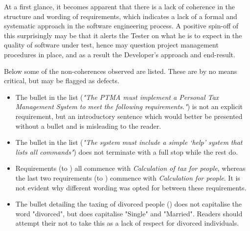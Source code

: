 At a first glance, it becomes apparent that there is a lack of coherence in the structure and wording of requirements, which indicates a lack of a formal and systematic approach in the software engineering process.  A positive spin-off of this surprisingly may be that it alerts the Tester on what he is to expect in the quality of software under test, hence may question project management procedures in place, and as a result the Developer’s approach and end-result.
\par
Below some of the non-coherences observed are listed. These are by no means critical, but may be flagged as defects.
\begin{itemize}
    \item The  bullet in the list (\textit{"The PTMA must implement a Personal Tax Management System to meet the following requirements."}) is not an explicit requirement, but an introductory sentence which would better be presented without a bullet and is misleading to the reader. 
    \item The  bullet in the list (\textit{"The system must include a simple ‘help’ system that lists all commands"}) does not terminate with a full stop while the rest do. 
    \item Requirements (\REightFive to \REightTen) all commence with \textit{Calculation of tax for people}, whereas the last two requirements (\REightEleven to \REightTwelve) commence with \textit{Calculation for people}. It is not evident why different wording was opted for between these requirements. 
    \item The bullet detailing the taxing of divorced people (\REightSeven) does not capitalise the word "divorced", but does capitalise "Single" and "Married". Readers should attempt their not to take this as a lack of respect for divorced individuals. 
\end{itemize}

